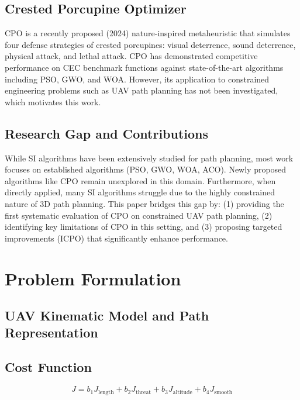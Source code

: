 \documentclass[12pt,a4paper]{article}
\begin{document}
\subsection{Crested Porcupine Optimizer}
CPO \cite{cpo} is a recently proposed (2024) nature-inspired metaheuristic 
that simulates four defense strategies of crested porcupines: visual 
deterrence, sound deterrence, physical attack, and lethal attack. CPO 
has demonstrated competitive performance on CEC benchmark functions 
against state-of-the-art algorithms including PSO, GWO, and WOA. 
However, its application to constrained engineering problems such as 
UAV path planning has not been investigated, which motivates this work.

\subsection{Research Gap and Contributions}
While SI algorithms have been extensively studied for path planning, 
most work focuses on established algorithms (PSO, GWO, WOA, ACO). 
Newly proposed algorithms like CPO remain unexplored in this domain. 
Furthermore, when directly applied, many SI algorithms struggle due to 
the highly constrained nature of 3D path planning. This paper bridges 
this gap by: (1) providing the first systematic evaluation of CPO on 
constrained UAV path planning, (2) identifying key limitations of CPO 
in this setting, and (3) proposing targeted improvements (ICPO) that 
significantly enhance performance.

\section{Problem Formulation}

\subsection{UAV Kinematic Model and Path Representation}

\subsection{Cost Function}
\begin{equation}
    J = b_1 J_{\text{length}} + b_2 J_{\text{threat}} + b_3 J_{\text{altitude}} + b_4 J_{\text{smooth}}
\end{equation}
\end{document}

